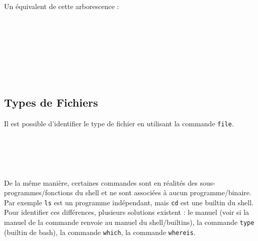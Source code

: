 Un équivalent de cette arborescence :\\

\\
\\
\\
\\
\\
\\
\\

\bigskip


\newpage
\subsection{Types de Fichiers}

\bigskip

Il est possible d'identifier le type de fichier en utilisant la commande \texttt{file}.\\

\\
\\
\\
\\
\\

De la même manière, certaines commandes sont en réalités des sous-programmes/fonctions du shell et ne sont associées à aucun programme/binaire.
Par exemple \texttt{ls} est un programme indépendant, mais \texttt{cd} est une builtin du shell.
Pour identifier ces différences, plusieurs solutions existent : le manuel (voir si la manuel de la commande renvoie au manuel du shell/builtins), la commande \texttt{type} (builtin de bash), la commande \texttt{which}, la commande \texttt{whereis}.\\

\\
\\
\\
\\

\\
\\
\\
\\

